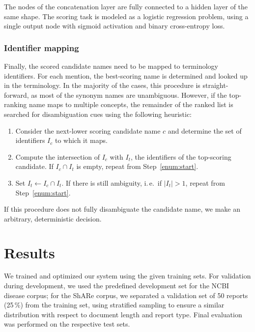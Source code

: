 \documentclass{bioinfo}
\newcommand{\ie}{i.\,e.\ }
\begin{document}
The nodes of the concatenation layer are fully connected to a hidden layer of the same shape.
The scoring task is modeled as a logistic regression problem, using a single output node with sigmoid activation and binary cross-entropy loss.

\subsubsection{Identifier mapping}
\label{ssub:id-mapping}

Finally, the scored candidate names need to be mapped to terminology identifiers.
For each mention, the best-scoring name is determined and looked up in the terminology.
In the majority of the cases, this procedure is straight-forward, as most of the synonym names are unambiguous.  %
However, if the top-ranking name maps to multiple concepts, the remainder of the ranked list is searched for disambiguation cues using the following heuristic:
\begin{enumerate}
  \item\label{enum:start} Consider the next-lower scoring candidate name $c$ and determine the set of identifiers $I_c$ to which it maps.
  \item Compute the intersection of $I_c$ with $I_t$, the identifiers of the top-scoring candidate. If $I_c \cap I_t$ is empty, repeat from Step~\ref{enum:start}.
  \item Set $I_t \leftarrow I_c \cap I_t$. If there is still ambiguity, \ie if $|I_t| > 1$, repeat from Step~\ref{enum:start}.
\end{enumerate}
If this procedure does not fully disambiguate the candidate name, we make an arbitrary, deterministic decision.




\section{Results}

We trained and optimized our system using the given training sets.
For validation during development, we used the predefined development set for the NCBI disease corpus; for the ShARe corpus, we separated a validation set of 50 reports (25\,\%) from the training set, using stratified sampling to ensure a similar distribution with respect to document length and report type.
Final evaluation was performed on the respective test sets.
\end{document}
